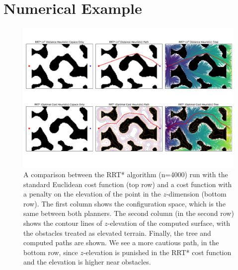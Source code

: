 \documentclass[letterpaper, 12pt]{article}
\def\startmodif{\color{blue}}
\def\stopmodif{\color{black}\normalcolor}
\begin{document}
\section{\startmodif Numerical Example \stopmodif}
\begin{figure}
    \centering
    \includegraphics[width=0.9\linewidth]{./figures/rrt_surface_fig.pdf}
    \caption{A comparison between the RRT* algorithm (n=4000) run with the standard Euclidean cost function (top row) and a cost function with a penalty on the elevation of the point in the $z$-dimension (bottom row). The first column shows the configuration space, which is the same between both planners. The second column (in the second row) shows the contour lines of $z$-elevation of the computed surface, with the obstacles treated as elevated terrain. Finally, the tree and computed paths are shown. We see a more cautious path, in the bottom row, since $z$-elevation is punished in the RRT* cost function and the elevation is higher near obstacles.}
\end{figure}

\printbibliography
\end{document}
